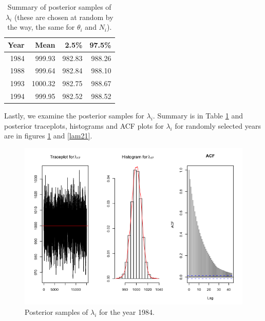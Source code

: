 \documentclass{asaproc}
\newcommand{\lami}{\lambda_i}
\newcommand{\theti}{\theta_i}
\newcommand{\Ni}{N_i}
\begin{document}
\begin{table}[h!]
\centering
\begin{tabular}{rrrr}
  \hline
Year & Mean & 2.5\% & 97.5\% \\ 
  \hline
1984 & 999.93 & 982.83 & 988.26 \\ 
  1988 & 999.64 & 982.84 & 988.10 \\ 
  1993 & 1000.32 & 982.75 & 988.67 \\ 
  1994 & 999.95 & 982.52 & 988.52 \\ 
   \hline
\end{tabular}
\caption{Summary of posterior samples of $\lami$ (these are chosen at random by the way, the same for $\theti$ and $\Ni$).}
\label{summary_lam}
\end{table}

Lastly, we examine the posterior samples for $\lami$. Summary is in Table \ref{summary_lam} and posterior traceplots, histograms and ACF plots for $\lami$ for randomly selected years are in figures \ref{lam17} and \ref{lam21}.
   


\begin{figure}[h!]
    \centering
    \includegraphics[scale = 0.35]{lam17.png}
    \caption{Posterior samples of $\lami$ for the year 1984.}
    \label{lam17}
\end{figure}
\end{document}
